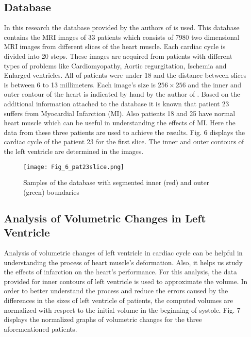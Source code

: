 \documentclass{jicspack}
\begin{document}
\subsection{Database}

In this research the database provided by the authors of \cite{23} is used. This database
contains the MRI images of 33 patients which consists of 7980 two dimensional MRI images
from different slices of the heart muscle. Each cardiac cycle is divided into 20 steps. These
images are acquired from patients with different types of problems like Cardiomyopathy,
Aortic regurgitation, Ischemia and Enlarged ventricles. All of patients were under 18 and the
distance between slices is between 6 to 13 millimeters. Each image's size is $256\times256$ and the
inner and outer contour of the heart is indicated by hand by the author of \cite{23}. Based on the
additional information attached to the database it is known that patient 23 suffers from
Myocardial Infarction (MI). Also patients 18 and 25 have normal heart muscle which can be useful in understanding the effects of MI. Here the data from these three patients are used
to achieve the results. Fig. 6 displays the cardiac cycle of the patient 23 for the first slice. The inner and outer contours of the left ventricle are determined in the images. 

\begin{figure}
\centering
\texttt{[image: Fig\_6\_pat23slice.png]}
\caption{Samples of the database with segmented inner (red) and outer (green) boundaries}
\end{figure}

\subsection{Analysis of Volumetric Changes in Left Ventricle}

Analysis of volumetric changes of left ventricle in cardiac cycle can be helpful in
understanding the process of heart muscle's deformation. Also, it helps us study the effects of infarction on the heart's performance.
For this analysis, the data provided for inner contours of left ventricle is used to approximate
the volume. In order to better understand the process and reduce the errors caused
by the differences in the sizes of left ventricle of patients, the computed volumes are normalized with
respect to the initial volume in the beginning of systole. Fig. 7 displays the
normalized graphs of volumetric changes for the three aforementioned patients. 
\end{document}
